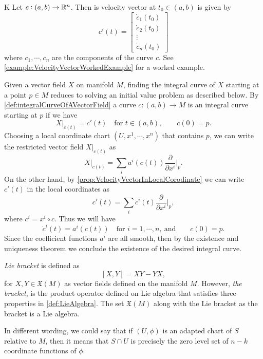 \begin{summary}K
	Let $ c:(a,b) \to \mathbb{R}^n $. Then is velocity vector at $ t_0 \in (a,b) $ is given by
	\[ 
	c'(t) = 
	\begin{bmatrix}
		\dot{c}_1(t_0) \\
		\dot{c}_2(t_0) \\
		\vdots \\
		\dot{c}_n(t_0)
	\end{bmatrix}
	 \]
	where $ c_1,\cdots,c_n $ are the components of the curve $ c $. See \autoref{example:VelocityVectorWorkedExample} for a worked example.
\end{summary}


\begin{summary}
	Given a vector field $ X $ on manifold $ M $, finding the integral curve of $ X $ starting at a point $ p \in M $ reduces to solving an initial value problem as described below. By \autoref{def:integralCurveOfAVectorField} a curve $ c:(a,b) \to M $ is an integral curve starting at $ p $ if we have
	\[ X|_{c(t)} = c'(t) \quad \text{for } t\in (a,b),\qquad c(0) = p.   \]
	Choosing a local coordinate chart $ (U,x^1,\cdots,x^n) $ that contains $ p $, we can write the restricted vector field $ X|_{c(t)} $ as
	\[ X|_{c(t)} = \sum_i a^i(c(t)) \frac{\partial}{\partial x^i}\big|_{p}.  \]
	On the other hand, by \autoref{prop:VelocityVectorInLocalCorodinate} we can write $ c'(t) $ in the local coordinates as
	\[ c'(t) = \sum_i \dot{c}^i(t) \frac{\partial }{\partial x^i}\big|_{p},    \]
	where $ c^i = x^i \circ c $.
	Thus we will have
	\[ \dot{c}^i(t) = a^i(c(t)) \quad \text{for } i=1,\cdots,n,\ \text{and} \qquad c(0) = p.\]
	Since the coefficient functions $ a^i $ are all smooth, then by the existence and uniqueness theorem we conclude the existence of the desired integral curve. 
\end{summary}

\begin{summary}
	\emph{Lie bracket} is defined as 
	\[ [X,Y] = XY - YX, \]
	for $ X,Y \in \mathfrak{X}(M) $ as vector fields defined on the manifold $ M $. However, \emph{the bracket}, is the product operator defined on Lie algebra that satisfies three properties in \autoref{def:LieAlgebra}. The set $ \mathfrak{X}(M) $ along with the Lie bracket as the bracket is a Lie algebra. 
\end{summary}

\begin{summary}
	In different wording, we could say that if $ (U,\phi) $ is an adapted chart of $ S  $ relative to $ M $, then it means that $ S\cap U $ is precisely the zero level set of $ n-k $ coordinate functions of $ \phi $.
\end{summary}



\newpage

